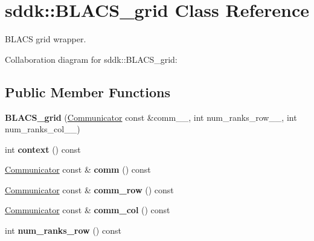 \hypertarget{classsddk_1_1_b_l_a_c_s__grid}{}\section{sddk\+:\+:B\+L\+A\+C\+S\+\_\+grid Class Reference}
\label{classsddk_1_1_b_l_a_c_s__grid}


B\+L\+A\+C\+S grid wrapper.  




Collaboration diagram for sddk\+:\+:B\+L\+A\+C\+S\+\_\+grid\+:
\subsection*{Public Member Functions}
\begin{DoxyCompactItemize}
\item 
\hypertarget{classsddk_1_1_b_l_a_c_s__grid_a8418df3bf366314d3f7b2c0c4f3ebca3}{}{\bfseries B\+L\+A\+C\+S\+\_\+grid} (\hyperlink{classsddk_1_1_communicator}{Communicator} const \&comm\+\_\+\+\_\+, int num\+\_\+ranks\+\_\+row\+\_\+\+\_\+, int num\+\_\+ranks\+\_\+col\+\_\+\+\_\+)\label{classsddk_1_1_b_l_a_c_s__grid_a8418df3bf366314d3f7b2c0c4f3ebca3}

\item 
\hypertarget{classsddk_1_1_b_l_a_c_s__grid_a1d9748e553228a81c01ba18fc17f853e}{}int {\bfseries context} () const \label{classsddk_1_1_b_l_a_c_s__grid_a1d9748e553228a81c01ba18fc17f853e}

\item 
\hypertarget{classsddk_1_1_b_l_a_c_s__grid_a90fb0b1f11383ffc2facb44654f0d733}{}\hyperlink{classsddk_1_1_communicator}{Communicator} const \& {\bfseries comm} () const \label{classsddk_1_1_b_l_a_c_s__grid_a90fb0b1f11383ffc2facb44654f0d733}

\item 
\hypertarget{classsddk_1_1_b_l_a_c_s__grid_ae7d75837d695b9f01dedff0064c0df49}{}\hyperlink{classsddk_1_1_communicator}{Communicator} const \& {\bfseries comm\+\_\+row} () const \label{classsddk_1_1_b_l_a_c_s__grid_ae7d75837d695b9f01dedff0064c0df49}

\item 
\hypertarget{classsddk_1_1_b_l_a_c_s__grid_a2efc64f4b137151e10d5819c72877337}{}\hyperlink{classsddk_1_1_communicator}{Communicator} const \& {\bfseries comm\+\_\+col} () const \label{classsddk_1_1_b_l_a_c_s__grid_a2efc64f4b137151e10d5819c72877337}

\item 
\hypertarget{classsddk_1_1_b_l_a_c_s__grid_a4d6c800d3fdd013fe75b8f1ebd07b38b}{}int {\bfseries num\+\_\+ranks\+\_\+row} () const \label{classsddk_1_1_b_l_a_c_s__grid_a4d6c800d3fdd013fe75b8f1ebd07b38b}


\end{DoxyCompactItemize}
